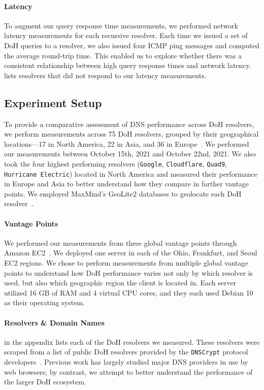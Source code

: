 \paragraph{Latency}
To augment our query response time measurements, we performed network latency measurements for each recursive resolver.
Each time we issued a set of DoH queries to a resolver, we also issued four ICMP ping messages and computed the average round-trip time.
This enabled us to explore whether there was a consistent relationship between high query response times and network latency.
 lists resolvers that did not respond to our latency measurements.

\subsection{Experiment Setup}
To provide a comparative assessment of DNS performance across DoH resolvers, we perform measurements across 75 DoH resolvers, grouped by their geographical locations—17 in North America, 22 in Asia, and 36 in Europe~\cite{dnscrypt}.
We performed our measurements between October 15th, 2021 and October 22nd, 2021.
We also took the four highest performing resolvers (\texttt{Google}, \texttt{Cloudflare}, \texttt{Quad9}, \texttt{Hurricane Electric}) located in North America and measured their performance in Europe and Asia to better understand how they compare in farther vantage points.  
We employed MaxMind's GeoLite2 databases to geolocate each DoH resolver~\cite{maxmind}.

\paragraph{Vantage Points}
We performed our measurements from three global vantage points through Amazon EC2~\cite{amazon_ec2}.
We deployed one server in each of the Ohio, Frankfurt, and Seoul EC2 regions.
We chose to perform measurements from multiple global vantage points to understand how DoH performance varies not only by which resolver is used, but also which geographic region the client is located in.
Each server utilized 16 GB of RAM and 4 virtual CPU cores, and they each used Debian 10 as their operating system.

\paragraph{Resolvers \& Domain Names}
 in the appendix lists each of the DoH resolvers we measured.
These resolvers were scraped from a list of public DoH resolvers provided by the \texttt{DNSCrypt} protocol developers~\cite{dnscrypt-public-resolvers}.
Previous work has largely studied major DNS providers in use by web browsers; by contrast, we attempt to better understand the performance of the larger DoH ecosystem.

